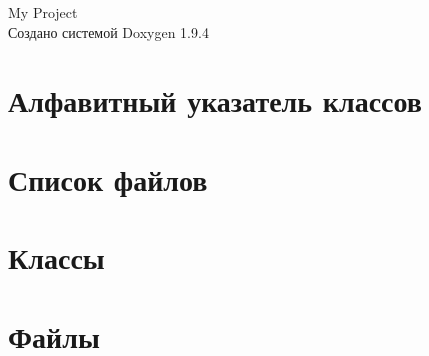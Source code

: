 \documentclass[twoside]{book}
\newcommand{\+}{\discretionary{\mbox{\scriptsize$\hookleftarrow$}}{}{}}
\newcommand{\clearemptydoublepage}{%
    \newpage{\pagestyle{empty}\cleardoublepage}%
  }
\begin{document}
  \raggedbottom
    \hypersetup{pageanchor=false,
                bookmarksnumbered=true,
                pdfencoding=unicode
               }
  \begin{titlepage}
  \vspace*{7cm}
  \begin{center}%
  {\Large My Project}\\
  \vspace*{1cm}
  {\large Создано системой Doxygen 1.9.4}\\
  \end{center}
  \end{titlepage}
  \clearemptydoublepage
  \tableofcontents
  \clearemptydoublepage
  \hypersetup{pageanchor=true}
\chapter{Алфавитный указатель классов}

\chapter{Список файлов}

\chapter{Классы}

\chapter{Файлы}




  \backmatter
  \newpage
  \clearemptydoublepage
  \printindex
\end{document}
